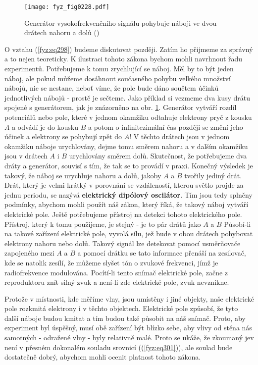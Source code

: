     \begin{figure}[ht!] %
      \centering
      \texttt{[image: fyz\_fig0228.pdf]}
      \caption{Generátor vysokofrekvenčního signálu pohybuje náboji ve dvou drátech nahoru a dolů
               (\cite[s.~375]{Feynman01})}
      \label{fyz:fig0228}
    \end{figure}
    
    O vztahu (\ref{fyz:eq298}) budeme diskutovat později. Zatím ho přijmeme za správný a to nejen 
    teoreticky. K ilustraci tohoto zákona bychom mohli navrhnout řadu experimentů. Potřebujeme k 
    tomu zrychlující se náboj. Měl by to být jeden náboj, ale pokud můžeme dosáhnout současného 
    pohybu velkého množství nábojů, nic se nestane, neboť víme, že pole bude dáno součtem účinků 
    jednotlivých nábojů - prostě je sečteme. Jako příklad si vezmeme dva kusy drátu spojené s 
    generátorem, jak je znázorněno na obr. \ref{fyz:fig0228}. Generátor vytváří rozdíl potenciálů 
    nebo pole, které v jednom okamžiku odtahuje elektrony pryč z kousku \(A\) a odvádí je do kousku 
    \(B\) a potom o infinitezimální čas později se změní jeho účinek a elektrony se pohybují zpět 
    do \(A\)! V těchto drátech jsou v jednom okamžiku náboje urychlovány, dejme tomu směrem nahoru 
    a v dalším okamžiku jsou v drátech \(A\) i \(B\) urychlovány směrem dolů. Skutečnost, že 
    potřebujeme dva dráty a generátor, souvisí s tím, že tak se to provádí v praxi. Konečný 
    výsledek je takový, že náboj se urychluje nahoru a dolů, jakoby \(A\) a \(B\) tvořily jediný 
    drát. Drát, který je velmi krátký v porovnání se vzdáleností, kterou světlo projde za jednu 
    periodu, se nazývá \textbf{elektrický dipólový oscilátor}. Tím jsou tedy splněny podmínky, 
    abychom mohli použít náš zákon, který říká, že takový náboj vytváří elektrické pole. Ještě 
    potřebujeme přístroj na detekci tohoto elektrického pole. Přístroj, který k tomu použijeme, je 
    stejný - je to pár drátů jako \(A\) a \(B\) Působí-li na takové zařízení elektrické pole, 
    vyvolá sílu, jež bude v obou drátech pohybovat elektrony nahoru nebo dolů. Takový signál lze 
    detekovat pomocí usměrňovače zapojeného mezi \(A\) a \(B\) a pomocí drátku se tato informace 
    přenáší na zesilovač, kde se natolik zesílí, že můžeme slyšet tón o zvukové frekvenci, jímž je 
    radiofrekvence modulována. Pocítí-li tento snímač elektrické pole, začne z reproduktoru znít 
    silný zvuk a není-li zde elektrické pole, zvuk nevznikne.

    Protože v místnosti, kde měříme vlny, jsou umístěny i jiné objekty, naše elektrické pole 
    rozkmitá elektrony i v těchto objektech. Elektrické pole způsobí, že tyto další náboje budou 
    kmitat a tím budou také působit na náš snímač. Proto, aby experiment byl úspěšný, musí obě 
    zařízení být blízko sebe, aby vlivy od stěna nás samotných - odražené vlny - byly relativně 
    malé. Proto se ukáže, že zkoumaný jev není v přesném dokonalém souladu srovnicí 
    ((\ref{fyz:eq301})), ale soulad bude dostatečně dobrý, abychom mohli ocenit platnost tohoto 
    zákona.
    
